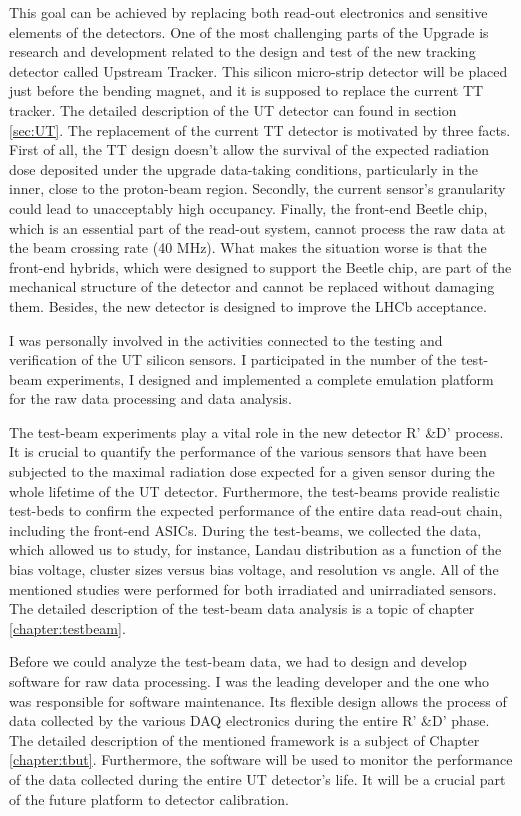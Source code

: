 This goal can be achieved by replacing both read-out electronics and sensitive elements of the detectors. One of the most challenging parts of the Upgrade is research and development related to the design and test of the new tracking detector called Upstream Tracker. This silicon micro-strip detector will be placed just before the bending magnet, and it is supposed to replace the current TT tracker. The detailed description of the UT detector can found in section \ref{sec:UT}.  The replacement of the current TT detector is motivated by three facts. First of all, the TT design doesn't allow the survival of the expected radiation dose deposited under the upgrade data-taking conditions, particularly in the inner, close to the proton-beam region. Secondly, the current sensor's granularity could lead to unacceptably high occupancy. Finally, the front-end Beetle chip, which is an essential part of the read-out system, cannot process the raw data at the beam crossing rate (40 MHz). What makes the situation worse is that the front-end hybrids, which were designed to support the Beetle chip, are part of the mechanical structure of the detector and cannot be replaced without damaging them. Besides, the new detector is designed to improve the LHCb acceptance. 

I was personally involved in the activities connected to the testing and verification of the UT silicon sensors. I participated in the number of the test-beam experiments, I designed and implemented a complete emulation platform for the raw data processing and data analysis. 

The test-beam experiments play a vital role in the new detector R' \&D' process. It is crucial to quantify the performance of the various sensors that have been subjected to the maximal radiation dose expected for a given sensor during the whole lifetime of the UT detector. Furthermore, the test-beams provide realistic test-beds to confirm the expected performance of the entire data read-out chain, including the front-end ASICs. During the test-beams, we collected the data, which allowed us to study, for instance, Landau distribution as a function of the bias voltage, cluster sizes versus bias voltage, and resolution vs angle. All of the mentioned studies were performed for both irradiated and unirradiated sensors. The detailed description of the test-beam data analysis is a topic of chapter  \ref{chapter:testbeam}.

Before we could analyze the test-beam data, we had to design and develop software for raw data processing. I was the leading developer and the one who was responsible for software maintenance.  Its flexible design allows the process of data collected by the various DAQ electronics during the entire R' \&D' phase. The detailed description of the mentioned framework is a subject of Chapter \ref{chapter:tbut}. Furthermore, the software will be used to monitor the performance of the data collected during the entire UT detector's life. It will be a crucial part of the future platform to detector calibration. 

